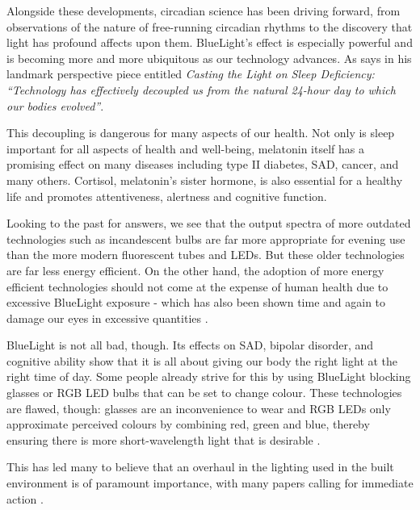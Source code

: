 Alongside these developments, circadian science has been driving forward, from observations of the nature of free-running circadian rhythms to the discovery that light has profound affects upon them. \Gls{BlueLight}'s effect is especially powerful and is becoming more and more ubiquitous as our technology advances. As \citet{czeislerPerspectiveCastingLight2013} says in his landmark perspective piece entitled \textit{Casting the Light on Sleep Deficiency: ``Technology has effectively decoupled us from the natural 24-hour day to which our bodies evolved''}. 

This decoupling is dangerous for many aspects of our health. Not only is sleep important for all aspects of health and well-being, melatonin itself has a promising effect on many diseases including type II diabetes, SAD, cancer, and many others. Cortisol, melatonin's sister hormone, is also essential for a healthy life and promotes attentiveness, alertness and cognitive function.

Looking to the past for answers, we see that the output spectra of more outdated technologies such as incandescent bulbs are far more appropriate for evening use than the more modern fluorescent tubes and LEDs. But these older technologies are far less energy efficient. On the other hand, the adoption of more energy efficient technologies should not come at the expense of human health \citep{boyceReviewImpactLight2010} due to excessive \gls{BlueLight} exposure - which has also been shown time and again to damage our eyes in excessive quantities \citep{uedaEyeDamageControl2009, kuseDamagePhotoreceptorderivedCells2014, niwanoBlueLightInjures2014, marekBlueLightPhototoxicity2018, nakamuraExposureExcessiveBlue2018}.

\Gls{BlueLight} is not all bad, though. Its effects on SAD, bipolar disorder, and cognitive ability show that it is all about giving our body the right light at the right time of day. Some people already strive for this by using \gls{BlueLight} blocking glasses or RGB LED bulbs that can be set to change colour. These technologies are flawed, though: glasses are an inconvenience to wear and RGB LEDs only approximate perceived colours by combining red, green and blue, thereby ensuring there is more short-wavelength light that is desirable \citep{gilewskiEcologicalHarmfulnessRGB2018}.

This has led many to believe that an overhaul in the lighting used in the built environment is of paramount importance, with many papers calling for immediate action \citep{webbConsiderationsLightingBuilt2006, boyceReviewImpactLight2010, groseArtificialLightNight2014}.




